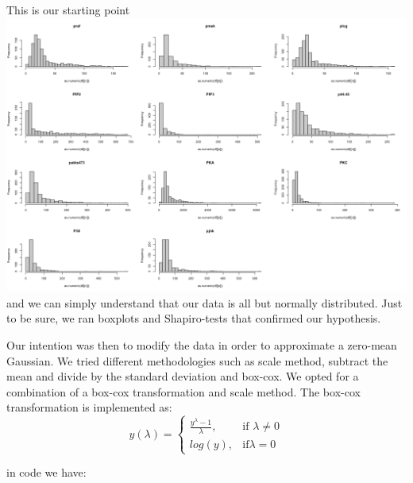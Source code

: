 \documentclass[
]{article}
\newenvironment{Shaded}{\begin{snugshade}}{\end{snugshade}}
\newcommand{\ControlFlowTok}[1]{\textcolor[rgb]{0.13,0.29,0.53}{\textbf{#1}}}
\newcommand{\DataTypeTok}[1]{\textcolor[rgb]{0.13,0.29,0.53}{#1}}
\newcommand{\DecValTok}[1]{\textcolor[rgb]{0.00,0.00,0.81}{#1}}
\newcommand{\KeywordTok}[1]{\textcolor[rgb]{0.13,0.29,0.53}{\textbf{#1}}}
\newcommand{\NormalTok}[1]{#1}
\newcommand{\OperatorTok}[1]{\textcolor[rgb]{0.81,0.36,0.00}{\textbf{#1}}}
\newcommand{\StringTok}[1]{\textcolor[rgb]{0.31,0.60,0.02}{#1}}
\begin{document}
This is our starting point
\includegraphics{data/distribution_plots/original/pma.png} and we can
simply understand that our data is all but normally distributed. Just to
be sure, we ran boxplots and Shapiro-tests that confirmed our
hypothesis.

Our intention was then to modify the data in order to approximate a
zero-mean Gaussian. We tried different methodologies such as scale
method, subtract the mean and divide by the standard deviation and
box-cox. We opted for a combination of a box-cox transformation and
scale method. The box-cox transformation is implemented as:
\begin{equation}
y(\lambda)= 
\begin{cases}
    \frac{y^{\lambda}-1}{\lambda},& \text{if } \lambda \neq 0\\
    log(y),              & \text{if} \lambda = 0
\end{cases}
\end{equation}

in code we have:

\begin{Shaded}
\end{Shaded}
\end{document}
